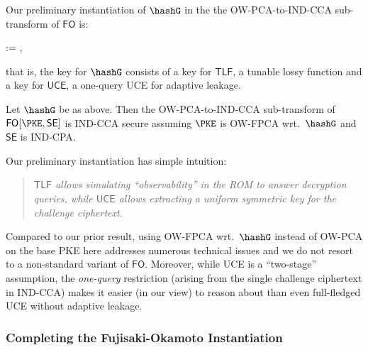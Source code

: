 Our preliminary instantiation of $\hashG$ in the  the OW-PCA-to-IND-CCA sub-transform  of $\mathsf{FO}$  
is: \begin{newmath}\hashG :=  \circ {} \;, \end{newmath}%
that is, the key for $\hashG$ consists of a key for $\mathsf{TLF}$, a tunable lossy function and a key for $\mathsf{UCE}$,  a one-query  UCE for adaptive leakage.%
\begin{conj} \label{conj-fo}
    Let $\hashG$ be as above. Then the  OW-PCA-to-IND-CCA sub-transform of  $\mathsf{FO}[\PKE,\mathsf{SE}]$ is IND-CCA secure assuming   $\PKE$ is OW-FPCA wrt.~$\hashG$ and $\mathsf{SE}$ is IND-CPA.
\end{conj}
Our  preliminary instantiation  has   simple intuition: 
 \begin{quote}
\emph{$\mathsf{TLF}$ allows simulating ``observability'' in the ROM to answer decryption queries,  while $\mathsf{UCE}$ allows extracting a uniform symmetric key for the challenge ciphertext.}
\end{quote}

\noindent Compared to our prior result, using OW-FPCA wrt.~$\hashG$ instead of OW-PCA on the base PKE here addresses numerous technical issues and we do not resort to a non-standard variant of $\mathsf{FO}$. Moreover, while UCE is a ``two-stage'' assumption, the \emph{one-query} restriction (arising from the single challenge ciphertext  in IND-CCA) makes it easier (in our view) to reason about than even full-fledged UCE without adaptive leakage.


 \subsubsection{Completing the Fujisaki-Okamoto Instantiation} \label{sec-fuj-cont}
 
